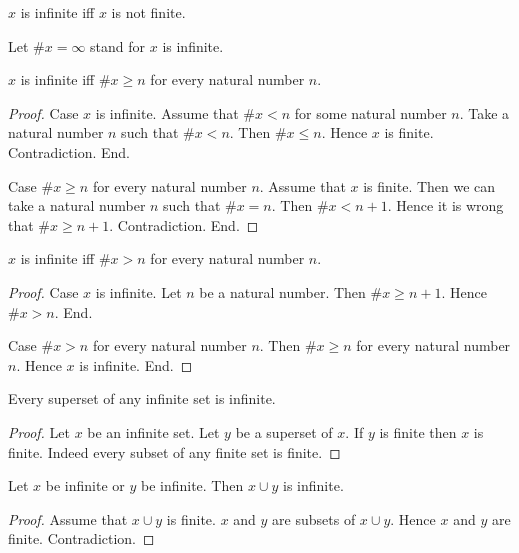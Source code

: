 \documentclass[../../set-theory.tex]{subfiles}
\begin{document}
  \begin{forthel}
    \begin{definition}
      $x$ is infinite iff $x$ is not finite.
    \end{definition}

    Let $\# x = \infty$ stand for $x$ is infinite.

    \begin{proposition}\label{SetTheory_03_01_313468}
      $x$ is infinite iff $\# x \geq n$ for every natural number $n$.
    \end{proposition}
    \begin{proof}
      Case $x$ is infinite.
        Assume that $\# x < n$ for some natural number $n$.
        Take a natural number $n$ such that $\# x < n$.
        Then $\# x \leq n$.
        Hence $x$ is finite.
        Contradiction.
      End.

      Case $\# x \geq n$ for every natural number $n$.
        Assume that $x$ is finite.
        Then we can take a natural number $n$ such that $\# x = n$.
        Then $\# x < n + 1$.
        Hence it is wrong that $\# x \geq n + 1$.
        Contradiction.
      End.
    \end{proof}

    \begin{corollary}\label{SetTheory_03_01_102225}
      $x$ is infinite iff $\# x > n$ for every natural number $n$.
    \end{corollary}
    \begin{proof}
      Case $x$ is infinite.
        Let $n$ be a natural number.
        Then $\# x \geq n + 1$.
        Hence $\# x > n$.
      End.

      Case $\# x > n$ for every natural number $n$.
        Then $\# x \geq n$ for every natural number $n$.
        Hence $x$ is infinite.
      End.
    \end{proof}

    \begin{proposition}\label{SetTheory_03_01_795476}
      Every superset of any infinite set is infinite.
    \end{proposition}
    \begin{proof}
      Let $x$ be an infinite set.
      Let $y$ be a superset of $x$.
      If $y$ is finite then $x$ is finite.
      Indeed every subset of any finite set is finite.
    \end{proof}

    \begin{proposition}\label{SetTheory_03_01_258223}
      Let $x$ be infinite or $y$ be infinite.
      Then $x \cup y$ is infinite.
    \end{proposition}
    \begin{proof}
      Assume that $x \cup y$ is finite.
      $x$ and $y$ are subsets of $x \cup y$.
      Hence $x$ and $y$ are finite.
      Contradiction.
    \end{proof}


\end{forthel}
\end{document}
